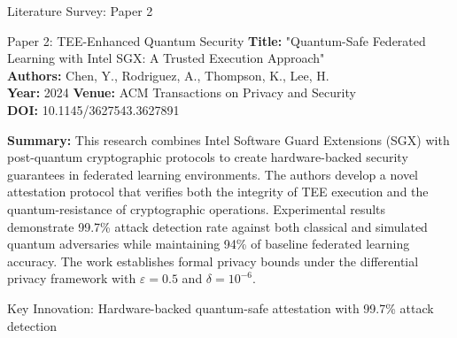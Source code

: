 \documentclass[aspectratio=169,11pt]{beamer}
\begin{document}
\begin{frame}{Literature Survey: Paper 2}

\begin{block}{Paper 2: TEE-Enhanced Quantum Security}
\textbf{Title:} "Quantum-Safe Federated Learning with Intel SGX: A Trusted Execution Approach"\\
\textbf{Authors:} Chen, Y., Rodriguez, A., Thompson, K., Lee, H.\\
\textbf{Year:} 2024 \textbf{Venue:} ACM Transactions on Privacy and Security\\
\textbf{DOI:} 10.1145/3627543.3627891
\end{block}

\textbf{Summary:} This research combines Intel Software Guard Extensions (SGX) with post-quantum cryptographic protocols to create hardware-backed security guarantees in federated learning environments. The authors develop a novel attestation protocol that verifies both the integrity of TEE execution and the quantum-resistance of cryptographic operations. Experimental results demonstrate 99.7\% attack detection rate against both classical and simulated quantum adversaries while maintaining 94\% of baseline federated learning accuracy. The work establishes formal privacy bounds under the differential privacy framework with $\varepsilon = 0.5$ and $\delta = 10^{-6}$.

\begin{center}
\footnotesize{Key Innovation: Hardware-backed quantum-safe attestation with 99.7\% attack detection}
\end{center}

\end{frame}
\end{document}
